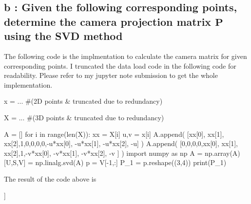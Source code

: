 \documentclass[10pt]{article}
\begin{document}
\subsection*{b : Given the following corresponding points, determine the camera projection matrix $\mathbf{P}$ using the SVD method} 
The following code is the implmentation to calculate the camera matrix for given corresponding points. 
I truncated the data load code in the following code for readability. Please refer to my jupyter note submission to get the whole implementation.
\begin{python}
x = ... #(2D points & truncated due to redundancy)

X = ... #(3D points & truncated due to redundancy)

A = []
for i in range(len(X)):
    xx = X[i]
    u,v = x[i]
    A.append(
        [xx[0], xx[1], xx[2],1,0,0,0,0,-u*xx[0], -u*xx[1], -u*xx[2], -u]
    )
    A.append(
        [0,0,0,0,xx[0], xx[1], xx[2],1,-v*xx[0], -v*xx[1], -v*xx[2], -v ]
    )
import numpy as np
A = np.array(A)
[U,S,V] = np.linalg.svd(A)
p = V[-1,:]
P_1 = p.reshape((3,4))
print(P_1)

\end{python}
The result of the code above is
\begin{python}
[[ 3.09963996e-03  1.46204548e-04 -4.48497465e-04 -9.78930678e-01]
 [ 3.07018252e-04  6.37193664e-04 -2.77356178e-03 -2.04144405e-01]
 [ 1.67933533e-06  2.74767684e-06 -6.83964827e-07 -1.32882928e-03]]
\end{python}
\end{document}
